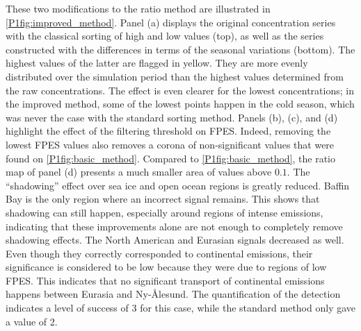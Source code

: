         These two modifications to the ratio method are illustrated in \cref{P1fig:improved_method}.
        Panel (a) displays the original concentration series with the classical sorting of high and low values (top), as well as the series constructed with the differences in terms of the seasonal variations (bottom).
        The highest values of the latter are flagged in yellow. They are more evenly distributed over the simulation period than the highest values determined from the raw concentrations.
        The effect is even clearer for the lowest concentrations; in the improved method, some of the lowest points happen in the cold season, which was never the case with the standard sorting method.
        Panels (b), (c), and (d) highlight the effect of the filtering threshold on FPES.
        Indeed, removing the  lowest FPES values also removes a corona of non-significant values that were found on \cref{P1fig:basic_method}.
        Compared to \cref{P1fig:basic_method}, the ratio map of panel (d) presents a much smaller area of values above $0.1$. The ``shadowing'' effect over sea ice and open ocean regions is greatly reduced.
        Baffin Bay is the only region where an incorrect signal remains.
        This shows that shadowing can still happen, especially around regions of intense emissions, indicating that these improvements alone are not enough to completely remove shadowing effects.
        The North American and Eurasian signals decreased as well. Even though they correctly corresponded to continental emissions, their significance is considered to be low because they were due to regions of low FPES. This indicates that no significant transport of continental emissions happens between Eurasia and Ny-Ålesund.
        The quantification of the detection indicates a level of success of 3 for this case, while the standard method only gave a value of 2.


